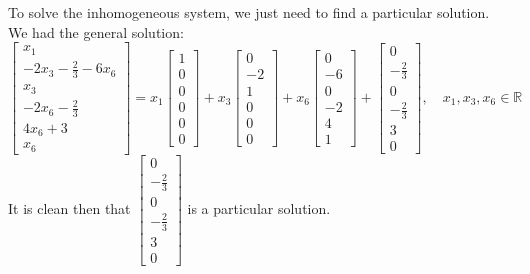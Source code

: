 \documentclass{article}
\begin{document}
To solve the inhomogeneous system, we just need to find a particular solution.
We had the general solution:
\[ \left[\begin{array}{c}
     x_1\\
     - 2 x_3 - \frac{2}{3} - 6 x_6\\
     x_3\\
     - 2 x_6 - \frac{2}{3}\\
     4 x_6 + 3\\
     x_6
   \end{array}\right] = x_1 \left[\begin{array}{c}
     1\\
     0\\
     0\\
     0\\
     0\\
     0
   \end{array}\right] + x_3 \left[\begin{array}{c}
     0\\
     - 2\\
     1\\
     0\\
     0\\
     0
   \end{array}\right] + x_6 \left[\begin{array}{c}
     0\\
     - 6\\
     0\\
     - 2\\
     4\\
     1
   \end{array}\right] + \left[\begin{array}{c}
     0\\
     - \frac{2}{3}\\
     0\\
     - \frac{2}{3}\\
     3\\
     0
   \end{array}\right], \quad x_1, x_3, x_6 \in \mathbb{R} \]
It is clean then that $\left[\begin{array}{c}
  0\\
  - \frac{2}{3}\\
  0\\
  - \frac{2}{3}\\
  3\\
  0
\end{array}\right]$ is a particular solution.
\end{document}
